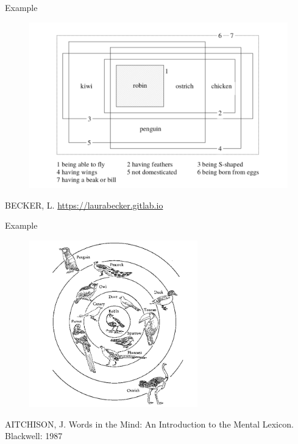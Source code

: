 \documentclass[10pt]{beamer}
\begin{document}
\begin{frame}{Example}
  \begin{figure}
    \centering
        \includegraphics[width=\textwidth]{img/familyres.png}
    \end{figure}
    
    {\scriptsize BECKER, L. \url{https://laurabecker.gitlab.io}}
\end{frame}

\begin{frame}{Example}
  \begin{figure}
    \centering
        \includegraphics[width=0.65\textwidth]{img/birdstyp.png}
    \end{figure}
    
    {\scriptsize AITCHISON, J. Words in the Mind: An Introduction to the Mental Lexicon. Blackwell: 1987}
\end{frame}
\end{document}
